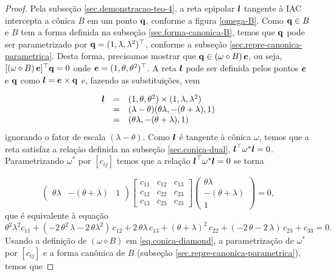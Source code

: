 \begin{proof}

Pela subseção \ref{sec.demonstracao-teo-4}, a reta epipolar $\boldsymbol{l}$ tangente à IAC intercepta a cônica $B$ em um ponto ${\bf q}$, conforme a figura \ref{omega-B}. Como ${\bf q}\in B$ e $B$ tem a forma definida na subseção \ref{sec.forma-canonica-B}, temos que ${\bf q}$ pode ser parametrizado por ${\bf q}=(1,\lambda,\lambda^2)^\top$, conforme a subseção \ref{sec.repre-canonica-parametrica}. Desta forma, precisamos mostrar que ${\bf q}\in (\omega\diamond B)\,\boldsymbol{e}$, ou seja, $[(\omega\diamond B)\,\boldsymbol{e}]^\top {\bf q}=0$ onde $\boldsymbol{e}=(1,\theta,\theta^2)^\top$. A reta $\boldsymbol{l}$ pode ser definida pelos pontos $\boldsymbol{e}$ e ${\bf q}$ como $\boldsymbol{l}=\boldsymbol{e}\times {\bf q}$ e, fazendo as substituições, vem

\begin{equation*}
\begin{array}{rcl}
\boldsymbol{l}&=&(1,\theta ,\theta^2)\times (1,\lambda,\lambda^2)\\
&=&(\lambda -\theta)(\theta\lambda,-(\theta+\lambda),1)\\
&=&(\theta\lambda,-(\theta+\lambda),1)
\end{array}
\end{equation*}
ignorando o fator de escala $(\lambda-\theta)$.
Como $\boldsymbol{l}$ é tangente à cônica $\omega$, temos que a reta satisfaz a relação definida na subseção \ref{sec.conica-dual}, $\boldsymbol{l}^\top\omega^*\boldsymbol{l}=0$. Parametrizando $\omega^*$ por $[c_{ij}]$ temos que a relação $\boldsymbol{l}^\top\omega^*\boldsymbol{l}=0$ se torna

\begin{equation*}
\begin{pmatrix}
\theta\lambda&-(\theta+\lambda)&1
\end{pmatrix}
\begin{bmatrix}
c_{11}&c_{12}&c_{13}\\
c_{12}&c_{22}&c_{23}\\
c_{13}&c_{23}&c_{33}
\end{bmatrix}
\begin{pmatrix}
\theta\lambda\\
-(\theta+\lambda)\\
1
\end{pmatrix}
=0,
\end{equation*}  
que é equivalente à equação
\begin{equation}\label{eq.expandida-omega-dual}
\theta^2\lambda^2 c_{11}+(-2\,\theta^2\,\lambda-2\,\theta\lambda^2)\,c_{12}+2\,\theta\lambda\,c_{13}+(\theta+\lambda)^2\,c_{22}+(-2\,\theta-2\,\lambda)\,c_{23}+c_{33}=0.
\end{equation} 
Usando a definição de $(\omega\diamond B)$ em \ref{eq.conica-diamond}, a parametrização de $\omega^*$ por $[c_{ij}]$ e a forma canônica de $B$ (subseção \ref{sec.repre-canonica-parametrica}), temos que


\end{proof}
